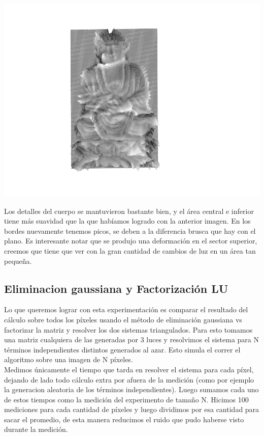 {\centering
    \includegraphics[scale=0.8]{informe/imagenes/profundidades/profundidadesBudaLucesPropias012.pdf} \\
}

Los detalles del cuerpo se mantuvieron bastante bien, y el área central e inferior tiene más suavidad que la que habíamos logrado con la anterior imagen. En los bordes nuevamente tenemos picos, se deben a la diferencia brusca que hay con el plano. Es interesante notar que se produjo una deformación en el sector superior, creemos que tiene que ver con la gran cantidad de cambios de luz en un área tan pequeña. \\


\subsection{Eliminacion gaussiana y Factorización LU}

Lo que queremos lograr con esta experimentación es comparar el resultado del cálculo sobre todos los píxeles usando el método de eliminación gaussiana vs factorizar la matriz y resolver los dos sistemas triangulados.
Para esto tomamos una matriz cualquiera de las generadas por 3 luces y resolvimos el sistema para N términos independientes distintos generados al azar. Esto simula el correr el algoritmo sobre una imagen de N píxeles.\\

Medimos únicamente el tiempo que tarda en resolver el sistema para cada píxel, dejando de lado todo cálculo extra por afuera de la medición (como por ejemplo la generacion aleatoria de los términos independientes). Luego sumamos cada uno de estos tiempos como la medición del experimento de tamaño N.
Hicimos 100 mediciones para cada cantidad de píxeles y luego dividimos por esa cantidad para sacar el promedio, de esta manera reducimos el ruido que pudo haberse visto durante la medición.

